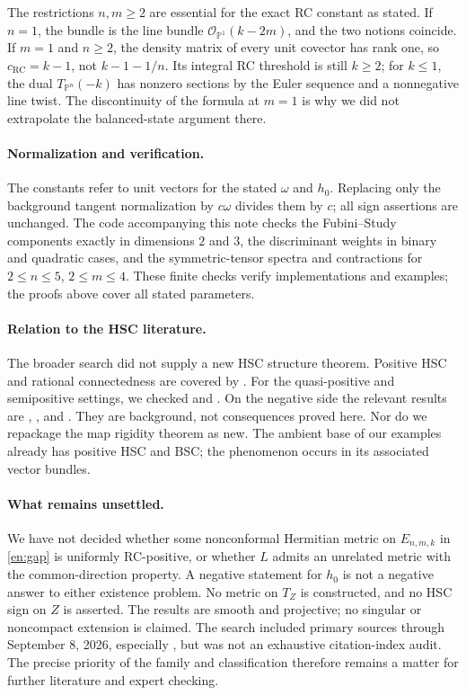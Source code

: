 \documentclass[12pt]{amsart}
\theoremstyle{definition}
\theoremstyle{remark}
\numberwithin{equation}{section}
\newcommand{\rc}{\mathrm{RC}}
\newcommand{\E}{E_{n,m,k}}
\newcommand{\Pp}{\mathbb P}
\newcommand{\eref}[1]{\eqref{en:#1}}
\begin{document}
The restrictions $n,m\ge2$ are essential for the exact RC constant as stated. If $n=1$, the bundle is the line bundle $\mathcal O_{\Pp^1}(k-2m)$, and the two notions coincide. If $m=1$ and $n\ge2$, the density matrix of every unit covector has rank one, so $c_{\rc}=k-1$, not $k-1-1/n$. Its integral RC threshold is still $k\ge2$; for $k\le1$, the dual $T_{\Pp^n}(-k)$ has nonzero sections by the Euler sequence and a nonnegative line twist. The discontinuity of the formula at $m=1$ is why we did not extrapolate the balanced-state argument there.

\paragraph{Normalization and verification.}
The constants refer to unit vectors for the stated $\omega$ and $h_0$. Replacing only the background tangent normalization by $c\omega$ divides them by $c$; all sign assertions are unchanged. The code accompanying this note checks the Fubini--Study components exactly in dimensions $2$ and $3$, the discriminant weights in binary and quadratic cases, and the symmetric-tensor spectra and contractions for $2\le n\le5$, $2\le m\le4$. These finite checks verify implementations and examples; the proofs above cover all stated parameters.

\paragraph{Relation to the HSC literature.}
The broader search did not supply a new HSC structure theorem. Positive HSC and rational connectedness are covered by \cite[Theorem~1.7]{en:Y18}. For the quasi-positive and semipositive settings, we checked \cite[Theorems~1.4 and~1.5]{en:ZZ} and \cite[Theorem~1.1, Remark~1.2]{en:M25}. On the negative side the relevant results are \cite[Theorem~2]{en:WY}, \cite[Theorem~1.1, Corollary~1.2]{en:TY}, and \cite[Theorem~1.2]{en:DT}. They are background, not consequences proved here. Nor do we repackage the map rigidity theorem \cite[Theorem~1.1]{en:Ymaps} as new. The ambient base of our examples already has positive HSC and BSC; the phenomenon occurs in its associated vector bundles.

\paragraph{What remains unsettled.}
We have not decided whether some nonconformal Hermitian metric on $\E$ in \eref{gap} is uniformly RC-positive, or whether $L$ admits an unrelated metric with the common-direction property. A negative statement for $h_0$ is not a negative answer to either existence problem. No metric on $T_Z$ is constructed, and no HSC sign on $Z$ is asserted. The results are smooth and projective; no singular or noncompact extension is claimed. The search included primary sources through September 8, 2026, especially \cite{en:Wu26}, but was not an exhaustive citation-index audit. The precise priority of the family and classification therefore remains a matter for further literature and expert checking.
\end{document}
